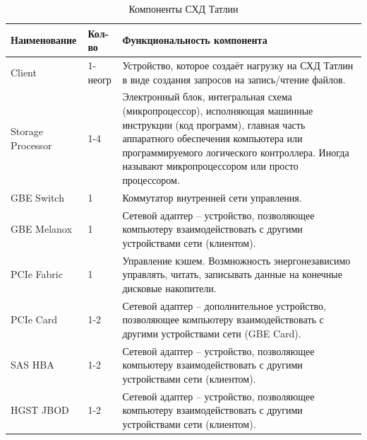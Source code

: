 \begin{table}[]
\centering
\caption{Компоненты СХД Татлин}
\label{tab:tatlib-setup}
\begin{tabularx}{\textwidth}{|X|X|X|}
\hline
Наименование      & Кол-во  & Функциональность компонента                                                                                                                                                                                                                                    \\ \hline
Client            & 1-неогр & Устройство, которое создаёт нагрузку на СХД Татлин в виде создания запросов на запись/чтение файлов.                                                                                                                                                           \\ \hline
Storage Processor & 1-4     & Электронный блок, интегральная схема (микропроцессор), исполняющая машинные инструкции (код программ), главная часть аппаратного обеспечения компьютера или программируемого логического контроллера. Иногда называют микропроцессором или просто процессором. \\ \hline
GBE Switch        & 1       & Коммутатор внутренней сети управления.                                                                                                                                                                                                                         \\ \hline
GBE Melanox       & 1       & Сетевой адаптер -- устройство, позволяющее компьютеру взаимодействовать с другими устройствами сети (клиентом).                                                                                                                                                \\ \hline
PCIe Fabric       & 1       & Управление кэшем. Возмножность энергонезависимо управлять, читать, записывать данные на конечные дисковые накопители.                                                                                                                                          \\ \hline
PCIe Card         & 1-2     & Сетевой адаптер -- дополнительное устройство, позволяющее компьютеру взаимодействовать с другими устройствами сети (GBE Card).                                                                                                                                 \\ \hline
SAS HBA           & 1-2     & Сетевой адаптер -- устройство, позволяющее компьютеру взаимодействовать с другими устройствами сети (клиентом).                                                                                                                                                \\ \hline
HGST JBOD         & 1-2     & Сетевой адаптер -- устройство, позволяющее компьютеру взаимодействовать с другими устройствами сети (клиентом).                                                                                                                                                \\ \hline
\end{tabularx}
\end{table}


